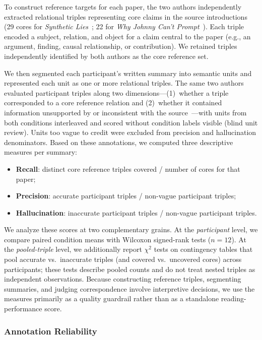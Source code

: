 \documentclass[manuscript,review,anonymous]{acmart}
\begin{document}
To construct reference targets for each paper, the two authors independently extracted relational triples representing core claims in the source introductions (29 cores for \textit{Synthetic Lies}~\cite{synthetic_lies}; 22 for \textit{Why Johnny Can't Prompt}~\cite{Zamfirescu-Pereira}). Each triple encoded a subject, relation, and object for a claim central to the paper (e.g., an argument, finding, causal relationship, or contribution). We retained triples independently identified by both authors as the core reference set.

We then segmented each participant's written summary into semantic units and represented each unit as one or more relational triples. The same two authors evaluated participant triples along two dimensions---(1)~whether a triple corresponded to a core reference relation and (2)~whether it contained information unsupported by or inconsistent with the source~\cite{maynez-etal-2020-faithfulness}---with units from both conditions interleaved and scored without condition labels visible (blind unit review). Units too vague to credit were excluded from precision and hallucination denominators. Based on these annotations, we computed three descriptive measures per summary:
\begin{itemize}[leftmargin=*, noitemsep]
    \item \textbf{Recall}: distinct core reference triples covered / number of cores for that paper;
    \item \textbf{Precision}: accurate participant triples / non-vague participant triples;
    \item \textbf{Hallucination}: inaccurate participant triples / non-vague participant triples.
\end{itemize}

We analyze these scores at two complementary grains. At the \emph{participant} level, we compare paired condition means with Wilcoxon signed-rank tests ($n=12$). At the \emph{pooled-triple} level, we additionally report $\chi^2$ tests on contingency tables that pool accurate vs.\ inaccurate triples (and covered vs.\ uncovered cores) across participants; these tests describe pooled counts and do not treat nested triples as independent observations. Because constructing reference triples, segmenting summaries, and judging correspondence involve interpretive decisions, we use the measures primarily as a quality guardrail rather than as a standalone reading-performance score.

\subsubsection{Annotation Reliability}
\end{document}
